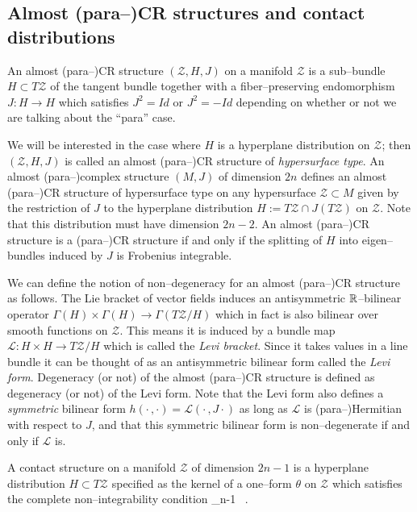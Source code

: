 \subsection{Almost (para--)CR structures and contact distributions}


\begin{defi}
An almost (para--)CR structure $(\mathcal{Z},H ,J)$ on a manifold $\mathcal{Z}$ is a sub--bundle $H \subset T\mathcal{Z}$ of the tangent bundle together with a fiber--preserving endomorphism $J:H \rightarrow H $ which satisfies $J^2=Id$ or $J^2=-Id$ depending on whether or not we are talking about the ``para'' case.
\end{defi}

We will be interested in the case where $ H $ is a hyperplane distribution on $\mathcal{Z}$; then $(\mathcal{Z}, H ,J)$ is called an almost (para--)CR structure of \textit{hypersurface type}. An almost (para--)complex structure $(M,J)$ of dimension $2n$ defines an almost (para--)CR structure of hypersurface type on any hypersurface $\mathcal{Z}\subset M$ given by the restriction of $J$ to the hyperplane distribution $ H :=T\mathcal{Z}\cap J(T\mathcal{Z})$ on $\mathcal{Z}$. Note that this distribution must have dimension $2n-2$. An almost (para--)CR structure is a (para--)CR structure if and only if the splitting of $ H $ into eigen--bundles induced by $J$ is Frobenius integrable.

We can define the notion of non--degeneracy for an almost (para--)CR structure as follows. The Lie bracket of vector fields induces an antisymmetric $\mathbb{R}$--bilinear operator $\Gamma( H )\times\Gamma( H )\rightarrow\Gamma(T\mathcal{Z}/ H )$ which in fact is also bilinear over smooth functions on $\mathcal{Z}$. This means it is induced by a bundle map $\mathcal{L}: H \times H \rightarrow T\mathcal{Z}/ H $ which is called the \textit{Levi bracket}. Since it takes values in a line bundle it can be thought of as an antisymmetric bilinear form called the \textit{Levi form}. Degeneracy (or not) of the almost (para--)CR structure is defined as degeneracy (or not) of the Levi form. Note that the Levi form also defines a \textit{symmetric} bilinear form $h(\cdot\,,\cdot)=\mathcal{L}(\cdot\,,J\cdot)$ as long as $\mathcal{L}$ is (para--)Hermitian with respect to $J$, and that this symmetric bilinear form is non--degenerate if and only if $\mathcal{L}$ is.

\begin{defi}
A contact structure on a manifold $\mathcal{Z}$ of dimension $2n-1$ is a hyperplane distribution $ H \subset T\mathcal{Z}$ specified as the kernel of a one--form $\theta$ on $\mathcal{Z}$ which satisfies the complete non--integrability condition
\be \label{eq:non_integrability}
\theta\wedge {}_{n-1\ } .
\ee
\end{defi}


